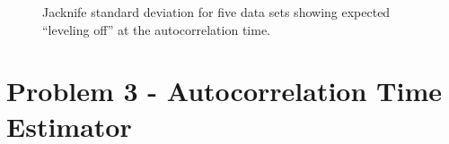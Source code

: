 \documentclass[singlepage,notitlepage,nofootinbib,11pt]{revtex4-1}
\begin{document}
\begin{figure}[h]
\caption{\label{jacks} Jacknife standard deviation for five data sets showing expected ``leveling off'' at the autocorrelation time.}
\end{figure}

\section{Problem 3 - Autocorrelation Time Estimator}

\clearpage
\end{document}

